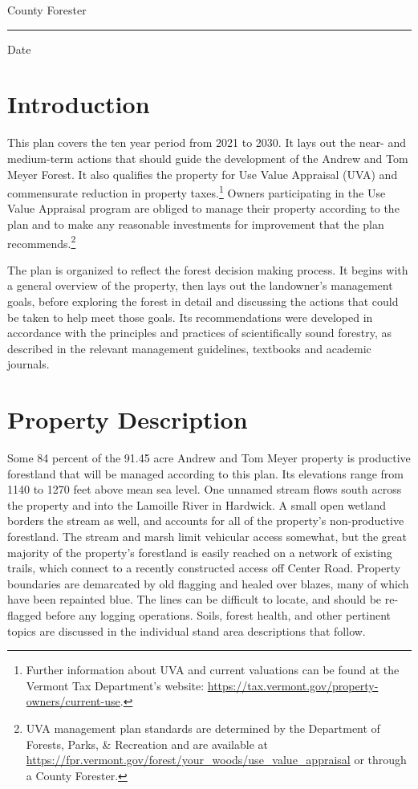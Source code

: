 \documentclass[]{tufte-handout}
\begin{document}
\noindent County Forester \rule{5.3cm}{0pt} Date

\pagebreak

\section{Introduction}\label{introduction}

This plan covers the ten year period from 2021 to 2030. It lays out the
near- and medium-term actions that should guide the development of the
Andrew and Tom Meyer Forest. It also qualifies the property for Use
Value Appraisal (UVA) and commensurate reduction in property
taxes.\footnote{Further information about UVA and current valuations can
  be found at the Vermont Tax Department's website:
  \url{https://tax.vermont.gov/property-owners/current-use}.
  \vspace{20pt}} Owners participating in the Use Value Appraisal program
are obliged to manage their property according to the plan and to make
any reasonable investments for improvement that the plan
recommends.\footnote{UVA management plan standards are determined by the
  Department of Forests, Parks, \& Recreation and are available at
  \url{https://fpr.vermont.gov/forest/your_woods/use_value_appraisal} or
  through a County Forester.}

The plan is organized to reflect the forest decision making process. It
begins with a general overview of the property, then lays out the
landowner's management goals, before exploring the forest in detail and
discussing the actions that could be taken to help meet those goals. Its
recommendations were developed in accordance with the principles and
practices of scientifically sound forestry, as described in the relevant
management guidelines, textbooks and academic journals.

\section{Property Description}\label{property-description}

Some 84 percent of the 91.45 acre Andrew and Tom Meyer property is
productive forestland that will be managed according to this plan. Its
elevations range from 1140 to 1270 feet above mean sea level. One
unnamed stream flows south across the property and into the Lamoille
River in Hardwick. A small open wetland borders the stream as well, and
accounts for all of the property's non-productive forestland. The stream
and marsh limit vehicular access somewhat, but the great majority of the
property's forestland is easily reached on a network of existing trails,
which connect to a recently constructed access off Center Road. Property
boundaries are demarcated by old flagging and healed over blazes, many
of which have been repainted blue. The lines can be difficult to locate,
and should be re-flagged before any logging operations. Soils, forest
health, and other pertinent topics are discussed in the individual stand
area descriptions that follow.
\end{document}
